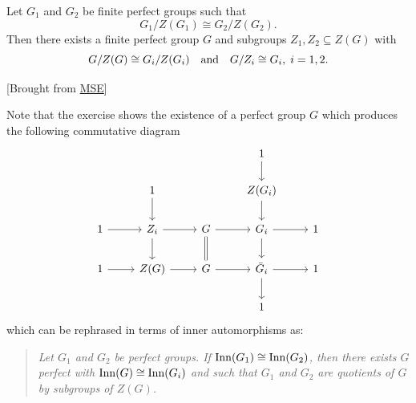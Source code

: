 \begin{exr}
    Let\/ $G_1$ and\/ $G_2$ be finite perfect groups such that
    $$
        G_1/Z(G_1)\cong G_2/Z(G_2).
    $$
    Then there exists a finite perfect group\/ $G$ and subgroups\/ $Z_1, Z_2 \subseteq Z(G)$ with
    $$
        G/Z(G) \cong G_i/Z(G_i)\quad\text{\upshape and}\quad G/Z_i \cong G_i,\; i=1,2.
    $$
\end{exr}

\begin{solution}
    {[Brought from \href{https://math.stackexchange.com/a/3419168/269050}{MSE}]}

    {\small Note that the exercise shows the existence of a perfect group $G$ which produces the following commutative diagram
    $$
        \begin{tikzcd}
            &&&1\arrow[d]\\
            &1\arrow[d]&&Z(G_i)\arrow[d]\\
            1\arrow[r]
                &Z_i\arrow[r]\arrow[d]
                &G\arrow[r]\arrow[d,no head, equal]
                &G_i\arrow[r]\arrow[d]&1\\
            1\arrow[r]
                &Z(G)\arrow[r]
                &G\arrow[r]
                &\bar G_i\arrow[r]\arrow[d]
                &1\\
            &&&1
    \end{tikzcd}
    $$
    which can be rephrased in terms of inner automorphisms as: 
    \begin{quote}
        \textit{Let\/ $G_1$ and\/ $G_2$ be perfect groups. If\/ ${\rm Inn}(G_1)\cong{\rm Inn}(G_2)$, then there exists\/ $G$ perfect with\/ ${\rm Inn}(G)\cong{\rm Inn}(G_i)$ and such that\/ $G_1$ and\/ $G_2$ are quotients of\/ $G$ by subgroups of\/ $Z(G)$.}
    \end{quote}}
    

\end{solution}

